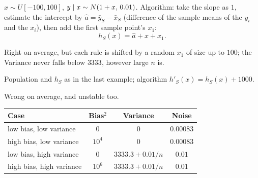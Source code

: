 \begin{example}
$x\sim U[-100,100]$, $y\mid x\sim N(1+x,\,0.01)$. Algorithm: take the slope as $1$, estimate the intercept by $\hat a=\bar y_S-\bar x_S$ (difference of the sample means of the $y_i$ and the $x_i$), then add the first sample point's $x_1$:
\[
  h_S(x)=\hat a+x+x_1.
\]
\begin{deriv}
\end{deriv}
Right on average, but each rule is shifted by a random $x_1$ of size up to $100$; the Variance never falls below $3333$, however large $n$ is.
\end{example}

\begin{example}
Population and $h_S$ as in the last example; algorithm $h'_S(x)=h_S(x)+1000$.
\begin{deriv}
\end{deriv}
Wrong on average, and unstable too.
\end{example}

\begin{center}
\renewcommand{\arraystretch}{1.3}
\begin{tabular}{@{}lccc@{}}
\toprule
Case & Bias$^2$ & Variance & Noise \\
\midrule
low bias, low variance & $0$ & $0$ & $0.00083$ \\
high bias, low variance & $10^4$ & $0$ & $0.00083$ \\
low bias, high variance & $0$ & $3333.3+0.01/n$ & $0.01$ \\
high bias, high variance & $10^6$ & $3333.3+0.01/n$ & $0.01$ \\
\bottomrule
\end{tabular}
\end{center}
